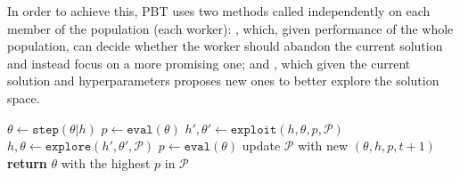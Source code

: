 In order to achieve this, PBT uses two methods called independently on each member of the population (each worker): \pbtexploit, which, given performance of the whole population, can decide whether the worker should abandon the current solution and instead focus on a more promising one; and \pbtexplore, which given the current solution and hyperparameters proposes new ones to better explore the solution space.


\begin{algorithm}[t]
    \caption{Population Based Training (PBT)}
    \label{pbtalg}
    \begin{algorithmic}[1] %
         
                \State $\theta \gets \mathtt{step}(\theta|h)$ 
                \State $p \gets \mathtt{eval}(\theta)$ 
                \State $h', \theta' \gets \mathtt{exploit}(h,\theta,p,\mathcal{P})$
                \State $h, \theta \gets \mathtt{explore}(h', \theta', \mathcal{P})$ 
                \State $p \gets \mathtt{eval}(\theta)$  
                \EndIf
                \EndIf
            \State update $\mathcal{P}$ with new $(\theta, h, p, t + 1)$ 
            \EndWhile\label{euclidendwhile}
            \EndFor
            \State \textbf{return} $\theta$ with the highest $p$ in $\mathcal{P}$
        \EndProcedure
    \end{algorithmic}
\label{alg:pbt}
\end{algorithm}




